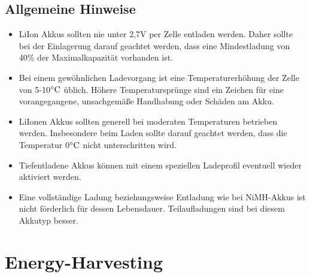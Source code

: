 \documentclass[12pt]{scrreprt} %
\begin{document}
\subsection{Allgemeine Hinweise}
\begin{itemize}
\item
LiIon Akkus sollten nie unter 2,7V per Zelle entladen werden. Daher sollte bei der Einlagerung darauf geachtet werden, dass eine Mindestladung von 40\% der Maximalkapazität vorhanden ist.
\item
Bei einem gewöhnlichen Ladevorgang ist eine Temperaturerhöhung der Zelle von 5-10$\celsius$ üblich. Höhere Temperatursprünge sind ein Zeichen für eine vorangegangene, unsachgemäße Handhabung oder Schäden am Akku. 
\item
LiIonen Akkus sollten generell bei moderaten Temperaturen betrieben werden. Insbesondere beim Laden sollte darauf geachtet werden, dass die Temperatur 0$\celsius$ nicht unterschritten wird.
\item
Tiefentladene Akkus können mit einem speziellen Ladeprofil eventuell wieder aktiviert werden.
\item
Eine vollständige Ladung beziehungsweise Entladung wie bei NiMH-Akkus ist nicht förderlich für dessen Lebensdauer. Teilaufladungen sind bei diesem Akkutyp besser.
\end{itemize}

\section{Energy-Harvesting}
\end{document}
